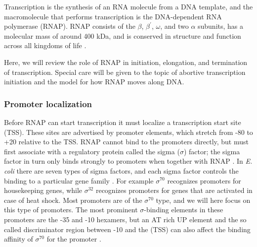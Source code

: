 %
Transcription is the synthesis of an RNA molecule from a DNA template, and the
macromolecule that performs transcription is the DNA-dependent RNA polymerase
(RNAP). RNAP consists of the $\beta$, $\beta^{\prime}$, $\omega$, and two
$\alpha$ subunits, has a molecular mass of around 400 kDa, and is conserved
in structure and function across all kingdoms of life \cite{borukhov_rna_2008}.

Here, we will review the role of RNAP in initiation, elongation, and
termination of transcription. Special care will be given to the topic of
abortive transcription initiation and the model for how RNAP moves along DNA.

\subsubsection{Promoter localization}
Before RNAP can start transcription it must localize a transcription start site
(TSS). These sites are advertised by promoter elements, which stretch from -80
to +20 relative to the TSS. RNAP cannot bind to the promoters directly, but
must first associate with a regulatory protein called the sigma ($\sigma$)
factor; the sigma factor in turn only binds strongly to promoters when together
with RNAP \cite{paget_70_2003}. In \textit{E. coli} there are seven types of
sigma factors, and each sigma factor controls the binding to a particular gene
family \cite{osterberg_regulation_2011}. For example $\sigma^{70}$ recognizes
promoters for housekeeping genes, while $\sigma^{32}$ recognizes promoters for
genes that are activated in case of heat shock. Most promoters are of the
$\sigma^{70}$ type, and we will here focus on this type of promoters. The most
prominent $\sigma$-binding elements in these promoters are the -35 and -10
hexamers, but an AT rich UP element and the so called discriminator region
between -10 and the (TSS) can also affect the binding affinity of $\sigma^{70}$
for the promoter \cite{ross_third_1993, haugen_fine_2008}.


